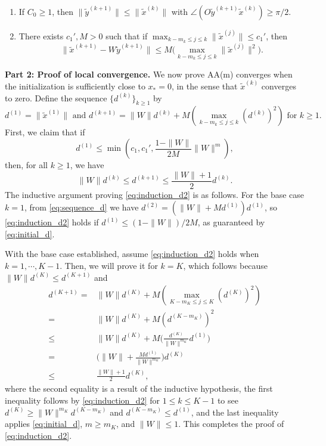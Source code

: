\documentclass[11pt]{article}
\begin{document}
{{\begin{enumerate}
\item[(P1)]  If $C_0\geq 1$, 
 then $\|\widetilde{y}^{(k+1)}\|\leq \|\widetilde{x}^{(k)}\|$ with  $\angle(O \widetilde{y}^{(k+1)} \widetilde{x}^{(k)} )\geq \pi/2$. 
\vspace{0.05in}

\item[(P2)]  There exists $c_1',M>0$ such that if $\max_{k-m_k\leq j\leq k}\|{\widetilde{x}}^{(j)}\|\leq c_1'$, then
\[
\|\widetilde{x}^{(k+1)}-W\widetilde{y}^{(k+1)}\| \leq   M\big(\max_{k-m_k\leq j\leq k}\|{\widetilde{x}}^{(j)}\|^2\big).
\]
\end{enumerate}
\vspace{0.1in}

\textbf{Part 2: Proof of local convergence.} We now prove AA(m) converges when the initialization is sufficiently close to $x_*=0$, in the sense that $\widetilde{x}^{(k)}$ converges to zero. 
Define the sequence $\{d^{(k)}\}_{k\geq 1}$ by 
\begin{equation}\text{$d^{(1)}=\|\widetilde{x}^{(1)}\|$ 
and $d^{(k+1)}=\|W\| d^{(k)}+ M(\max_{k-m_k\leq j\leq k}(d^{(k)})^2)$ for $k\geq 1$.}\label{eq:sequence_d}\end{equation} 
First, we claim that if 
\begin{equation}
d^{(1)}\leq \min\left(c_1, c_1', \frac{1-\|W\|}{2M}\|W\|^{m}\right),\label{eq:initial_d}
\end{equation} 
then, {for all $k\geq 1$}, we have 
\begin{equation}\label{eq:induction_d2}
\|W\|d^{(k)}\leq d^{(k+1)}\leq \frac{\|W\|+1}{2}d^{(k)}. %
\end{equation} 
The inductive argument proving  \eqref{eq:induction_d2} is as follows. {For the base case $k=1$, from \eqref{eq:sequence_d} we have $d^{(2)}=(\|W\|+Md^{(1)})d^{(1)}$, so \eqref{eq:induction_d2} holds if $d^{(1)}\leq (1-\|W\|)/2M$, as guaranteed by \eqref{eq:initial_d}.} 


With the base case established, assume \eqref{eq:induction_d2} holds when $k=1,\cdots,K-1$. Then, we will prove it for $k=K$, which follows  because 
$\|W\|d^{(K)}\leq d^{(K+1)}$ and 
\begin{align*}
d^{(K+1)}=&\|W\| d^{(K)}+ M(\max_{K-m_K\leq j\leq K}(d^{(K)})^2) \\
=& \|W\| d^{(K)}+ M(d^{(K-m_K)})^2\\
\leq &\|W\| d^{(K)}+  M\Big(\frac{d^{(K)}}{\|W\|^{m_K}} d^{(1)}\Big) \\
=& \Big(\|W\|+\frac{Md^{(1)}}{\|W\|^{m_K}}\Big)d^{(K)}\\
\leq& \frac{\|W\|+1}{2}d^{(K)},
\end{align*}
where the second equality is a result of the inductive hypothesis, 
the first inequality follows by \eqref{eq:induction_d2} for $1\leq k\leq K-1$ to see $d^{(K)}\geq \|W\|^{m_K}d^{(K-m_K)}$ and $d^{(K-m_K)}\leq d^{(1)}$, and the last inequality applies \eqref{eq:initial_d}, $m\geq m_K$, and $\|W\|\leq 1$. This completes the proof of \eqref{eq:induction_d2}.

}}
\end{document}
